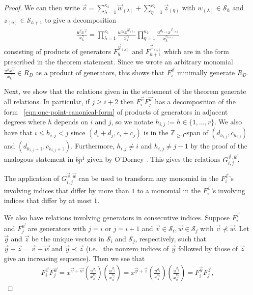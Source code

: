 \documentclass{amsart}
\theoremstyle{plain}
\theoremstyle{definition}
\theoremstyle{remark}
\numberwithin{equation}{section}
\newcommand\bz{{\mathbb Z}}
\newcommand\mss{\mathscr{S}}
\begin{document}
\begin{proof}
\noindent
We can then write $\vec{v}  = \sum_{\lambda=1}^{\kappa_1}\vec{w}_{(\lambda)} +
\sum_{\eta=1}^{\kappa_2} \vec z_{(\eta)}$ with $w_{(\lambda)} \in \mss_h$ and
$z_{(\eta)} \in \mss_{h+1}$ to give a decomposition
\begin{align}
\label{eqn:one-point-canonical-form}
	\frac{u^{\beta} x^{\vec{v}}} {x_k^{\gamma}}	= \prod_{\lambda = 1}
	^{\kappa_1} \frac{u^{d_h} x^{\vec{w}_{(\lambda)}}} {x_k^{c_h}}
	\prod_{\eta = 1}^{\kappa_2} \frac{u^{d_{h + 1}} x^{\vec{z}_{(\eta)}}}
	{x_k^{c_{h + 1}}}
\end{align}
\noindent
consisting of products of generators $F_h^{\vec{y}_{(\lambda)}}$
and $F_{h + 1}^{\vec{z}_{(\eta)}}$ which are in the form
prescribed in the theorem statement. Since we wrote an arbitrary monomial
$\frac{u^{\beta} x^{\vec{v}}}{x_k^\gamma} \in R_D$ as a product of generators,
this shows that $F_i^{\vec v}$ minimally generate $R_D$.

Next, we show that the relations given in the statement of the theorem generate all relations. 
In particular, if $j \geq i + 2$ then $F_i^{\vec{v}} F_j^{\vec{w}}$
has a decomposition of the form ~\eqref{eqn:one-point-canonical-form} of 
products of generators in adjacent degrees where $h$
depends on $i$ and $ j$, so we notate $h_{i, j} := h \in \{1, \ldots, r\}$. We 
also have that $i \leq h_{i, j} < j$ since $(d_i + d_j, c_i + c_j)$ is in the
$\bz_{\geq 0}$-span of $(d_{h_{i, j}}, c_{h_{i, j}})$ and
$(d_{h_{i, j} + 1}, c_{h_{i, j} + 1})$. Furthermore,
$h_{i, j} \neq i$ and $h_{i, j} \neq j - 1$ by the proof of the analogous 
statement in $bp^1$ given by O'Dorney
\cite[Theorem 6]{dorney:canonical}. This gives the relations
$G_{i, j}^{\vec{v}, \vec{w}}$.

The application of $G_{i, j}^{\vec{v}, \vec{w}}$ can be used
to transform any monomial in the $F_i^{\vec{v}}$'s involving
indices that differ by more than $1$ to a monomial in the $F_i
^{\vec{v}}$'s involving indices that differ by at most $1$.

We also have relations involving generators in consecutive
indices. Suppose $F_i^{\vec{v}}$ and $F_j^{\vec{w}}$ are
generators with $j = i$ or $j = i + 1$ and $\vec{v} \in
\mss_i, \vec{w} \in \mss_j$ with $\vec{v} \not\prec \vec{w}$.
Let $\vec{y}$ and $\vec{z}$ be the unique vectors in $\mss_i$ and
$\mss_j$, respectively, such that $\vec{y} + \vec{z} = \vec{v} +
\vec{w}$ and $\vec{y} \prec \vec{z}$ (i.e.~ the nonzero indices
of $\vec{y}$ followed by those of $\vec{z}$ give an increasing
sequence). Then we see that
\begin{align*}
	F_i^{\vec{v}} F_j^{\vec{w}} = x^{\vec{v} + \vec{w}}
	\left(\frac{u^{d_i}}{x_k^{c_i}}\right)
	\left(\frac{u^{d_j}}{x_k^{c_j}}\right)
	= x^{\vec{y} + \vec{z}}
	\left(\frac{u^{d_i}}{x_k^{c_i}}\right)
	\left(\frac{u^{d_j}}{x_k^{c_j}}\right)
	= F_i^{\vec{y}} F_j^{\vec{z}},
\end{align*}


\end{proof}
\end{document}
